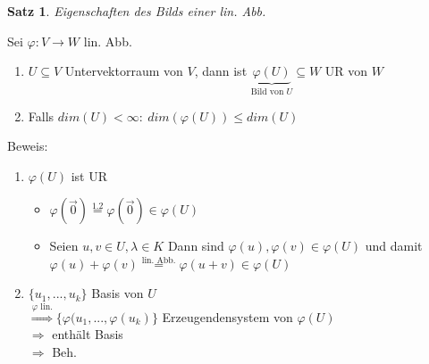 \documentclass[a4paper,11pt]{article}
\newtheorem{satz}[definition]{Satz}
\newcommand{\zerovec}{\overset{\rightarrow}{0}}
\begin{document}
\begin{satz}
Eigenschaften des Bilds einer lin. Abb.
\end{satz}
Sei $\varphi\colon V\rightarrow W$ lin. Abb.
\begin{enumerate}[label=\alph*)]
	\item $U\subseteq V$ Untervektorraum von $V$, dann ist $\underbrace{\varphi(U)}_{\text{Bild von }U}\subseteq W$ UR von $W$
	\item Falls $dim(U)<\infty:\:dim(\varphi(U))\leq dim(U)$
\end{enumerate}
Beweis:
\begin{enumerate}[label=\alph*)]
	\item $\varphi(U)$ ist UR
	\vspace{-3mm}
	\begin{itemize}
		\item $\varphi(\zerovec)\overset{1.2}{=}\varphi(\zerovec)\in\varphi(U)$
		\item Seien $u,v\in U,\lambda\in K$ Dann sind $\varphi(u),\varphi(v)\in\varphi(U)$ und damit \\ $\varphi(u)+\varphi(v)\overset{\text{lin. Abb.}}{=}\varphi(u+v)\in\varphi(U)$
	\end{itemize}
	\vspace{-3mm}
	\item $\{u_1,...,u_k\}$ Basis von $U$ \\ $\overset{\varphi\text{ lin.}}{\Rightarrow}\{\varphi(u_1,...,\varphi(u_k)\}$ Erzeugendensystem von $\varphi(U)$ \\ $\Rightarrow$ enthält Basis \\ $\Rightarrow$ Beh.
\end{enumerate}
\end{document}
